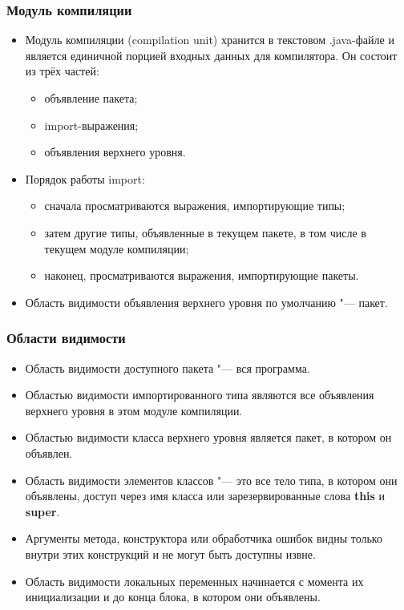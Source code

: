 \documentclass[default]{beamer}
\begin{document}
	\begin{frame}
		\frametitle{Модуль компиляции}
		
		\begin{itemize}
			\item Модуль компиляции (compilation unit) хранится в текстовом .java-файле и является единичной порцией входных данных для компилятора. Он состоит из трёх частей:
			\begin{itemize}
				\item объявление пакета;
				\item import-выражения;
				\item объявления верхнего уровня.
			\end{itemize}
			\item Порядок работы import:
			\begin{itemize}
				\item сначала просматриваются выражения, импортирующие типы;
				\item затем другие типы, объявленные в текущем пакете, в том числе в текущем модуле компиляции;
				\item наконец, просматриваются выражения, импортирующие пакеты.
			\end{itemize}
			\item Область видимости объявления верхнего уровня по умолчанию "--- пакет.
		\end{itemize}
	\end{frame}

	\begin{frame}
		\frametitle{Области видимости}
		
		\begin{itemize}
			\item Область видимости доступного пакета "--- вся программа.
			\item Областью видимости импортированного типа являются все объявления верхнего уровня в этом модуле компиляции.
			\item Областью видимости класса верхнего уровня является пакет, в котором он объявлен.
			\item Область видимости элементов классов "--- это все тело типа, в котором они объявлены, доступ через имя класса или зарезервированные слова \textbf{this} и \textbf{super}.
			\item Аргументы метода, конструктора или обработчика ошибок видны только внутри этих конструкций и не могут быть доступны извне.
			\item Область видимости локальных переменных начинается с момента их инициализации и до конца блока, в котором они объявлены.
		\end{itemize}
	\end{frame}
\end{document}
